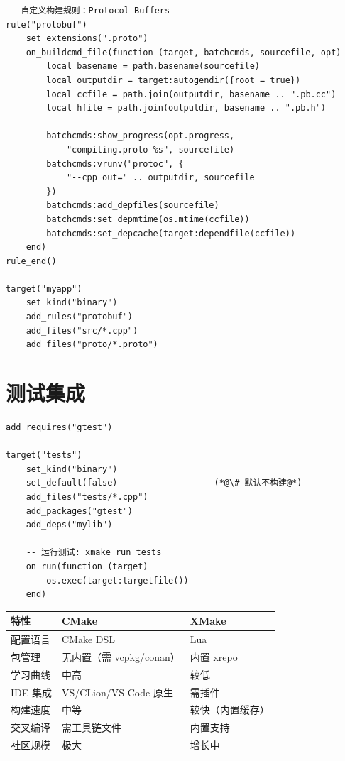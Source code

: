 \documentclass[12pt,a4paper,fontset=fandol]{ctexbook}
\begin{document}
\begin{lstlisting}[style=xmakestyle]
-- 自定义构建规则：Protocol Buffers
rule("protobuf")
    set_extensions(".proto")
    on_buildcmd_file(function (target, batchcmds, sourcefile, opt)
        local basename = path.basename(sourcefile)
        local outputdir = target:autogendir({root = true})
        local ccfile = path.join(outputdir, basename .. ".pb.cc")
        local hfile = path.join(outputdir, basename .. ".pb.h")

        batchcmds:show_progress(opt.progress,
            "compiling.proto %s", sourcefile)
        batchcmds:vrunv("protoc", {
            "--cpp_out=" .. outputdir, sourcefile
        })
        batchcmds:add_depfiles(sourcefile)
        batchcmds:set_depmtime(os.mtime(ccfile))
        batchcmds:set_depcache(target:dependfile(ccfile))
    end)
rule_end()

target("myapp")
    set_kind("binary")
    add_rules("protobuf")
    add_files("src/*.cpp")
    add_files("proto/*.proto")
\end{lstlisting}

\section{测试集成}

\begin{lstlisting}[style=xmakestyle]
add_requires("gtest")

target("tests")
    set_kind("binary")
    set_default(false)                   (*@\# 默认不构建@*)
    add_files("tests/*.cpp")
    add_packages("gtest")
    add_deps("mylib")

    -- 运行测试: xmake run tests
    on_run(function (target)
        os.exec(target:targetfile())
    end)
\end{lstlisting}

\begin{compare}[title=CMake vs XMake]
\begin{tabularx}{\textwidth}{lXX}
\toprule
\textbf{特性} & \textbf{CMake} & \textbf{XMake} \\
\midrule
配置语言 & CMake DSL & Lua \\
包管理 & 无内置（需 vcpkg/conan） & 内置 xrepo \\
学习曲线 & 中高 & 较低 \\
IDE 集成 & VS/CLion/VS Code 原生 & 需插件 \\
构建速度 & 中等 & 较快（内置缓存） \\
交叉编译 & 需工具链文件 & 内置支持 \\
社区规模 & 极大 & 增长中 \\
\bottomrule
\end{tabularx}
\end{compare}
\end{document}
